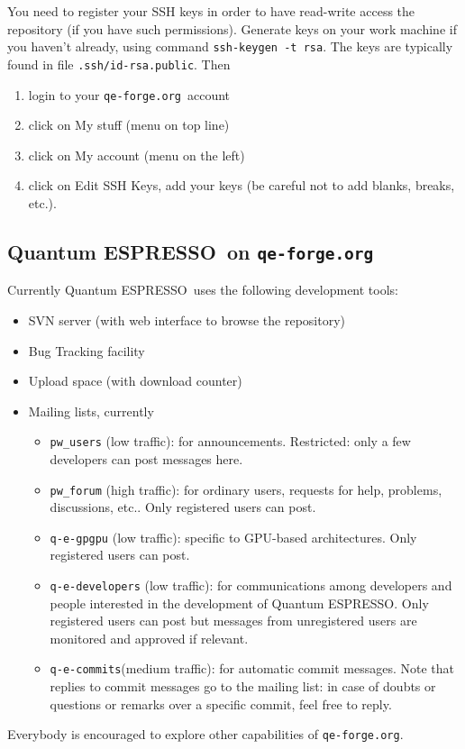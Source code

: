 \documentclass[12pt,a4paper]{article}
\def\qe{{\sc Quantum ESPRESSO}}
\def\qeforge{\texttt{qe-forge.org}}
\begin{document}
You need to register your SSH keys in order to have read-write 
access the repository (if you have such permissions). Generate
keys on your work machine if you haven't already, using command
\texttt{ssh-keygen -t rsa}. The keys are typically found
 in file \texttt{.ssh/id-rsa.public}. Then
\begin{enumerate}
\item login to your \qeforge\ account
\item click on My stuff (menu on top line)
\item click on My account (menu on the left)
\item click on Edit SSH Keys, add your keys (be careful not to add blanks,
breaks, etc.).
\end{enumerate}

\subsection{\qe\ on \qeforge}

Currently \qe\ uses the following development tools:
\begin{itemize}
\item SVN server (with web interface to browse the repository)
\item Bug Tracking facility
\item Upload space (with download counter)
\item Mailing lists, currently
\begin{itemize}
\item \texttt{pw\_users} (low traffic): for announcements.
Restricted: only a few developers can post messages here.
\item \texttt{pw\_forum} (high traffic): for ordinary users, 
requests for help, problems, discussions, etc.. Only
registered users can post.
\item \texttt{q-e-gpgpu} (low traffic): specific to GPU-based 
architectures. Only registered users can post.
\item \texttt{q-e-developers} (low traffic):
for communications among developers and people interested
in the development of \qe. Only registered users can post
but messages from unregistered users are monitored and 
approved if relevant.
\item \texttt{q-e-commits}(medium traffic): for automatic
commit messages. Note that replies to commit messages go
to the mailing list: in case of doubts or questions or 
remarks over a specific commit, feel free to reply.
\end{itemize}
\end{itemize}
Everybody is encouraged to explore other capabilities of \qeforge.
\end{document}
